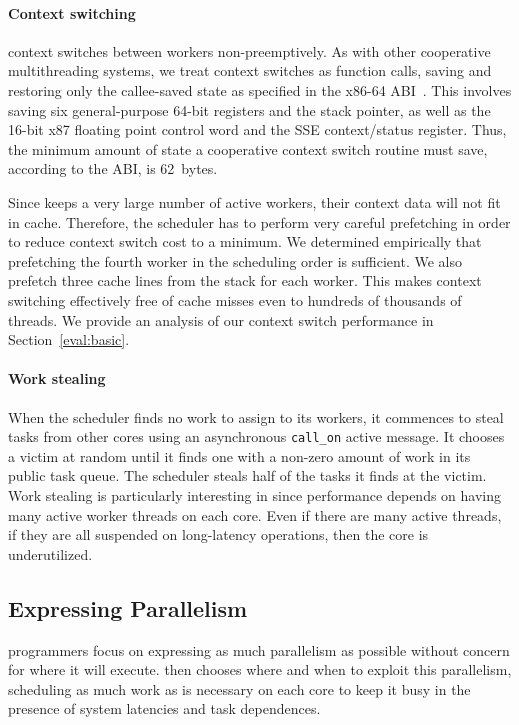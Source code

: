 \paragraph{Context switching} 
\Grappa context switches between workers non-preemptively. As with other
cooperative multithreading systems, we treat context switches as function
calls, saving and restoring only the callee-saved state as specified in the
x86-64 ABI~\cite{amd64:abi:2012}. This involves saving six general-purpose
64-bit registers and the stack pointer, as well as the 16-bit x87 floating
point control word and the SSE context/status register. Thus, the minimum
amount of state a cooperative context switch routine must save, according to
the ABI, is 62~bytes.

Since \Grappa keeps a very large number of active workers, their context data
will not fit in cache. Therefore, the scheduler has to perform very careful
prefetching in order to reduce context switch cost to a minimum. We determined
empirically that prefetching the fourth worker in the scheduling order is
sufficient. We also prefetch three cache lines from the stack for each worker.
This makes context switching effectively free of cache misses even to hundreds
of thousands of threads. We provide an analysis of our context switch
performance in Section~\ref{eval:basic}.

\paragraph{Work stealing} 
When the scheduler finds no work to assign to its workers, it commences to
steal tasks from other cores using an asynchronous \texttt{call\_on} active
message. It chooses a victim at random until it finds one with a non-zero
amount of work in its public task queue. The scheduler steals half of the
tasks it finds at the victim. Work stealing is particularly interesting in
\Grappa since performance depends on having many active worker threads on each
core. Even if there are many active threads, if they are all suspended on
long-latency operations, then the core is underutilized.

\subsection{Expressing Parallelism}

\Grappa programmers focus on expressing as much parallelism as possible
without concern for where it will execute. \Grappa then chooses where and when
to exploit this parallelism, scheduling as much work as is necessary on each
core to keep it busy in the presence of system latencies and task dependences.

